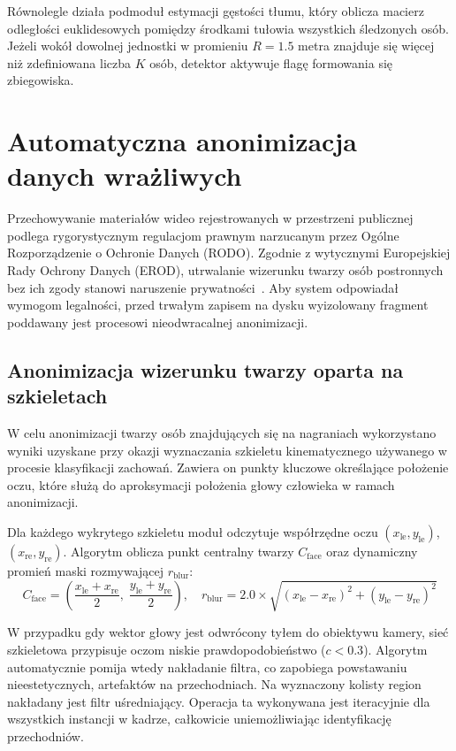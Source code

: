 Równolegle działa podmoduł estymacji gęstości tłumu, który oblicza macierz odległości euklidesowych pomiędzy środkami tułowia wszystkich śledzonych osób. Jeżeli wokół dowolnej jednostki w promieniu $R=1.5$ metra znajduje się więcej niż zdefiniowana liczba $K$ osób, detektor aktywuje flagę formowania się zbiegowiska.

\section{Automatyczna anonimizacja danych wrażliwych}\label{sec:detektor_anonimizacja}

Przechowywanie materiałów wideo rejestrowanych w przestrzeni publicznej podlega rygorystycznym regulacjom prawnym narzucanym przez Ogólne Rozporządzenie o Ochronie Danych (RODO). Zgodnie z wytycznymi Europejskiej Rady Ochrony Danych (EROD), utrwalanie wizerunku twarzy osób postronnych bez ich zgody stanowi naruszenie prywatności~\cite{gdpr_video_surveillance}. Aby system odpowiadał wymogom legalności, przed trwałym zapisem na dysku wyizolowany fragment poddawany jest procesowi nieodwracalnej anonimizacji.

\subsection{Anonimizacja wizerunku twarzy oparta na szkieletach}
W celu anonimizacji twarzy osób znajdujących się na nagraniach wykorzystano wyniki uzyskane przy okazji wyznaczania szkieletu kinematycznego używanego w procesie klasyfikacji zachowań. Zawiera on punkty kluczowe określające położenie oczu, które służą do aproksymacji położenia głowy człowieka w ramach anonimizacji.

Dla każdego wykrytego szkieletu moduł odczytuje współrzędne oczu $(x_{\text{le}}, y_{\text{le}})$, $(x_{\text{re}}, y_{\text{re}})$. Algorytm oblicza punkt centralny twarzy $C_{\text{face}}$ oraz dynamiczny promień maski rozmywającej $r_{\text{blur}}$:
\begin{equation}
    C_{\text{face}} = \left( \frac{x_{\text{le}} + x_{\text{re}}}{2}, \; \frac{y_{\text{le}} + y_{\text{re}}}{2} \right), \quad r_{\text{blur}} = 2.0 \times \sqrt{(x_{\text{le}} - x_{\text{re}})^2 + (y_{\text{le}} - y_{\text{re}})^2}
\end{equation}

W przypadku gdy wektor głowy jest odwrócony tyłem do obiektywu kamery, sieć szkieletowa przypisuje oczom niskie prawdopodobieństwo ($c < 0.3$). Algorytm automatycznie pomija wtedy nakładanie filtra, co zapobiega powstawaniu nieestetycznych, artefaktów na przechodniach. Na wyznaczony kolisty region nakładany jest filtr uśredniający. Operacja ta wykonywana jest iteracyjnie dla wszystkich instancji w kadrze, całkowicie uniemożliwiając identyfikację przechodniów.

